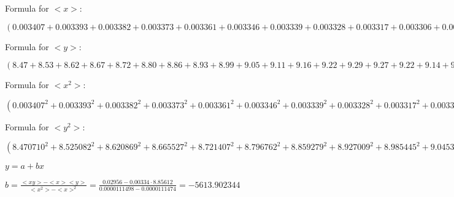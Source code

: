 \documentclass[12pt,a4paper]{article}
\begin{document}
\vspace{0,5cm}

Formula for $<x>:$

$(0.003407 + 0.003393 + 0.003382 + 0.003373 + 0.003361 + 0.003346 + 0.003339 + 0.003328 + 0.003317 + 0.003306 + 0.003295 + 0.003284 + 0.003273 + 0.003261 + 0.003260 + 0.003275 + 0.003288 + 0.003299 + 0.003310 + 0.003321 + 0.003346 + 0.003355 + 0.003366 + 0.003377 + 0.003389 + 0.003400 + 0.003412 + 0.003423) / 28$

\vspace{0,5cm}

Formula for $<y>:$

$(8.47 + 8.53 + 8.62 + 8.67 + 8.72 + 8.80 + 8.86 + 8.93 + 8.99 + 9.05 + 9.11 + 9.16 + 9.22 + 9.29 + 9.27 + 9.22 + 9.14 + 9.08 + 9.02 + 8.97 + 8.83 + 8.77 + 8.72 + 8.64 + 8.58 + 8.52 + 8.45 + 8.36) / 14$

\vspace{0,5cm}

Formula for $<x^2>:$

$(0.003407^2 + 0.003393^2 + 0.003382^2 + 0.003373^2 + 0.003361^2 + 0.003346^2 + 0.003339^2 + 0.003328^2 + 0.003317^2 + 0.003306^2 + 0.003295^2 + 0.003284^2 + 0.003273^2 + 0.003261^2 + 0.003260^2 + 0.003275^2 + 0.003288^2 + 0.003299^2 + 0.003310^2 + 0.003321^2 + 0.003346^2 + 0.003355^2 + 0.003366^2 + 0.003377^2 + 0.003389^2 + 0.003400^2 + 0.003412^2 + 0.003423^2) / 28$

\vspace{0,5cm}

Formula for $<y^2>:$

$(8.470710^2 + 8.525082^2 + 8.620869^2 + 8.665527^2 + 8.721407^2 + 8.796762^2 + 8.859279^2 + 8.927009^2 + 8.985445^2 + 9.045383^2 + 9.110807^2 + 9.155451^2 + 9.223503^2 + 9.288458^2 + 9.274800^2 + 9.220865^2 + 9.139832^2 + 9.079389^2 + 9.019894^2 + 8.968613^2 + 8.832413^2 + 8.770206^2 + 8.721407^2 + 8.639924^2 + 8.579153^2 + 8.521185^2 + 8.450968^2 + 8.356931^2) / 28$

\vspace{0,5cm}



$y = a + bx$

\vspace{0,5cm}

$b = \frac{<xy> - <x><y>}{<x^2> - <x>^2} = \frac{0.02956 - 0.00334 \cdot 8.85612}{0.0000111498 - 0.0000111474} = -5613.902344$

\vspace{0,5cm}
\end{document}
